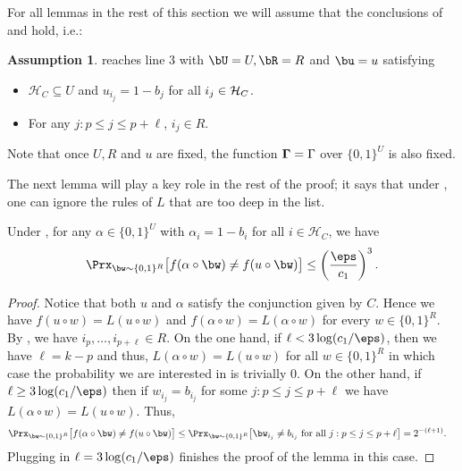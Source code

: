 \documentclass[11pt]{article}
\theoremstyle{definition}
\newtheorem{assumption}{Assumption}
\begin{document}
For all lemmas in the rest of this section we will assume that the conclusions of  and  hold, i.e.:

\begin{assumption}\label{assumption: U R are good}
 reaches line 3 with $\bU=U,\bR=R$ and $\bu=u$ satisfying\begin{itemize}
        \item $\mathcal{H}_C \subseteq  U$ and $ u_{i_j}=1-b_{j}$ for all $i_j\in {\cal H}_C$.
        \item For any $j:p \leq j \leq  p+\ell$, $i_j \in  R$.
    \end{itemize}
Note that once $U,R$ and $u$ are fixed, 
  the function $\mathbf{\Gamma}=\Gamma$ over $\{0,1\}^U$ is also fixed. 
\end{assumption}

The next lemma will play a key role in the rest of the proof; it says that under , one can ignore the rules of $L$ that are too deep in the list.
\begin{lemma}\label{thm: subcubes look the same}
Under ,
for any $\alpha\in \{0,1\}^{U}$ with $\alpha_i=1-b_i$ for all $i\in  \mathcal{H}_C$, we have 
\begin{align*}
    \Prx_{\bw \sim \{0,1\}^{R}}\big[f(\alpha \circ \bw) \neq f(u \circ \bw)\big] \leq \left(\frac{\eps}{ c_1}\right)^3.
\end{align*}
\end{lemma}
\begin{proof}
Notice that both $u$ and $\alpha$ satisfy the conjunction given by $C$. Hence we have $f(u \circ w)=L(u \circ w)$ and $f(\alpha \circ w)=L(\alpha \circ w)$ for every $w\in\{0,1\}^R$. By , we have $i_p, \ldots, i_{p+\ell} \in R$. 
On the one hand, if $\ell <3\log (c_1/\eps)$, then we have $\ell=k-p$ and thus,  $L(\alpha\circ w)=L(u\circ w)$ for all $w\in \{0,1\}^{R}$ in which case the probability we are interested in is 
  trivially $0$.
On the other hand, if $\ell \geq 3\log (c_1/\eps)$ then if $w_{i_j}=b_{i_j}$ for some $j: p \leq j \leq p + \ell$ we have $L(\alpha \circ w)=L(u \circ w)$. Thus, 
    \begin{align*}
        \Prx_{\bw \sim \{0,1\}^{R}}\big[f(\alpha \circ \bw) \neq f(u \circ \bw)\big] &\leq \Prx_{\bw \sim \{0,1\}^{R}}\big[ \text{$\bw_{i_j} \neq b_{i_j}$ for all $j:p \leq j \leq p + \ell$}\big] = 2^{-(\ell+1)}. 
\end{align*} 
Plugging in  $\ell=3\log (c_1/\eps)$   finishes the proof of the lemma in this case.
\end{proof}
\end{document}
